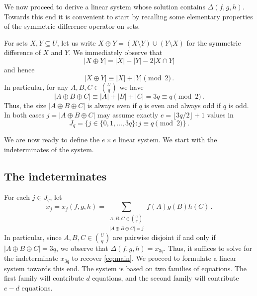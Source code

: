 \documentclass{amsart}
\begin{document}
We now proceed to derive a linear system whose solution contains
$\Delta(f,g,h)$. Towards this end it is convenient to start by
recalling some elementary properties of the symmetric difference 
operator on sets.

For sets $X,Y\subseteq U$, let us write 
$X\oplus Y=(X\setminus Y)\cup(Y\setminus X)$ for the symmetric 
difference of $X$ and $Y$. We immediately observe that 
\begin{equation}
\label{eq:xor-size}
|X\oplus Y|=|X|+|Y|-2|X\cap Y|
\end{equation}
and hence
\begin{equation}
\label{eq:xor-size-equiv-sum}
|X\oplus Y|\equiv |X|+|Y|\pmod 2\,.
\end{equation}
In particular, for any $A,B,C\in\binom{U}{q}$ we have 
\[
|A\oplus B\oplus C|\equiv |A|+|B|+|C|=3q\equiv q\pmod 2\,.
\]
Thus, the size $|A\oplus B\oplus C|$ is always even if $q$ is even 
and always odd if $q$ is odd. In both cases $j=|A\oplus B\oplus C|$
may assume exactly $e=\lfloor 3q/2\rfloor+1$ values in
\begin{equation}
\label{eq:jq}
J_q=\{j\in\{0,1,\ldots,3q\}:j\equiv q\!\!\!\pmod 2\}\,.
\end{equation}

We are now ready to define the $e\times e$ linear system. 
We start with the indeterminates of the system.

\subsection{The indeterminates}
For each $j\in J_q$, let 
\begin{equation}
\label{eq:xj}
x_j=x_j(f,g,h)=
\!\!\!\sum_{\substack{A,B,C\in\binom{U}{q}\\|A\oplus B\oplus C|=j}}\!\!\!
f(A)g(B)h(C)\,.
\end{equation}
In particular, since $A,B,C\in\binom{U}{q}$ are pairwise 
disjoint if and only if $|A\oplus B\oplus C|=3q$, 
we observe that $\Delta(f,g,h)=x_{3q}$. 
Thus, it suffices to solve for the indeterminate $x_{3q}$ 
to recover \eqref{eq:main}. We proceed to formulate a linear
system towards this end. The system is based on two families
of equations. The first family will contribute $d$ equations,
and the second family will contribute $e-d$ equations. 
\end{document}
